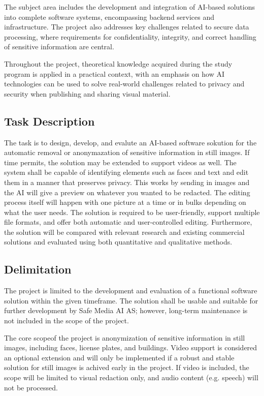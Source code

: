 The subject area includes the development and integration of AI-based solutions into complete software systems, encompassing backend services and infrastructure. The project also addresses key challenges related to secure data processing, where requirements for confidentiality, integrity, and correct handling of sensitive information are central.

Throughout the project, theoretical knowledge acquired during the study program is applied in a practical context, with an emphasis on how AI technologies can be used to solve real-world challenges related to privacy and security when publishing and sharing visual material.

\subsection{Task Description}

The task is to design, develop, and evalute an AI-based software sokution for the automatic removal or anonymazation of sensitive information in still images. If time permits, the solution may be extended to support videos as well. The system shall be capable of identifying elements such as faces and text and edit them in a manner that preserves privacy. This works by sending in images and the AI will give a preview on whatever you wanted to be redacted. The editing process itself will happen with one picture at a time or in bulks depending on what the user needs. The solution is required to be user-friendly, support multiple file formats, and offer both automatic and user-controlled editing. Furthermore, the solution will be compared with relevant research and existing commercial solutions and evaluated using both quantitative and qualitative methods.

\subsection{Delimitation}

The project is limited to the development and evaluation of a functional software solution within the given timeframe. The solution shall be usable and suitable for further development by Safe Media AI AS; however, long-term maintenance is not included in the scope of the project.

The core scopeof the project is anonymization of sensitive information in still images, including faces, license plates, and buildings. Video support is considered an optional extension and will only be implemented if a robust and stable solution for still images is achived early in the project. If video is included, the scope will be limited to visual redaction only, and audio content (e.g. speech) will not be processed.

